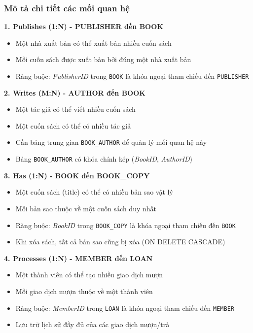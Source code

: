 \documentclass[12pt,a4paper]{article}
\newcommand{\entity}[1]{\texttt{#1}}
\newcommand{\attr}[1]{\textit{#1}}
\begin{document}
\subsubsection{Mô tả chi tiết các mối quan hệ}

\textbf{1. Publishes (1:N) - PUBLISHER đến BOOK}
\begin{itemize}
    \item Một nhà xuất bản có thể xuất bản nhiều cuốn sách
    \item Mỗi cuốn sách được xuất bản bởi đúng một nhà xuất bản
    \item Ràng buộc: \attr{PublisherID} trong \entity{BOOK} là khóa ngoại tham chiếu đến \entity{PUBLISHER}
\end{itemize}

\textbf{2. Writes (M:N) - AUTHOR đến BOOK}
\begin{itemize}
    \item Một tác giả có thể viết nhiều cuốn sách
    \item Một cuốn sách có thể có nhiều tác giả
    \item Cần bảng trung gian \entity{BOOK\_AUTHOR} để quản lý mối quan hệ này
    \item Bảng \entity{BOOK\_AUTHOR} có khóa chính kép (\attr{BookID}, \attr{AuthorID})
\end{itemize}

\textbf{3. Has (1:N) - BOOK đến BOOK\_COPY}
\begin{itemize}
    \item Một cuốn sách (title) có thể có nhiều bản sao vật lý
    \item Mỗi bản sao thuộc về một cuốn sách duy nhất
    \item Ràng buộc: \attr{BookID} trong \entity{BOOK\_COPY} là khóa ngoại tham chiếu đến \entity{BOOK}
    \item Khi xóa sách, tất cả bản sao cũng bị xóa (ON DELETE CASCADE)
\end{itemize}

\textbf{4. Processes (1:N) - MEMBER đến LOAN}
\begin{itemize}
    \item Một thành viên có thể tạo nhiều giao dịch mượn
    \item Mỗi giao dịch mượn thuộc về một thành viên
    \item Ràng buộc: \attr{MemberID} trong \entity{LOAN} là khóa ngoại tham chiếu đến \entity{MEMBER}
    \item Lưu trữ lịch sử đầy đủ của các giao dịch mượn/trả
\end{itemize}
\end{document}
